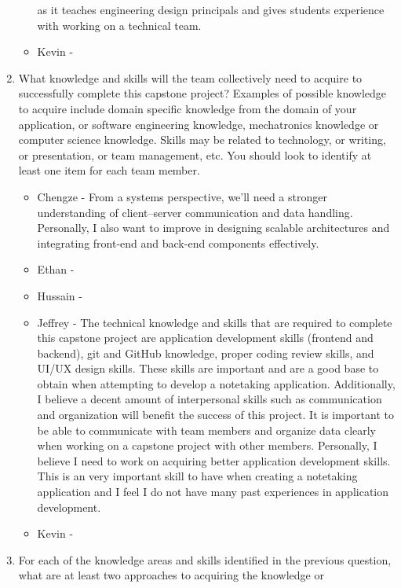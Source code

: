 \begin{enumerate}
\begin{itemize}
        as it teaches engineering design principals and gives students experience 
        with working on a technical team. 
        \item Kevin - 
  \end{itemize} 
  \item What knowledge and skills will the team collectively need to acquire to
  successfully complete this capstone project?  Examples of possible knowledge
  to acquire include domain specific knowledge from the domain of your
  application, or software engineering knowledge, mechatronics knowledge or
  computer science knowledge.  Skills may be related to technology, or writing,
  or presentation, or team management, etc.  You should look to identify at
  least one item for each team member.
  \begin{itemize}
        \item Chengze - From a systems perspective, we’ll need a stronger understanding 
        of client–server communication and data handling. Personally, I also want to 
        improve in designing scalable architectures and integrating front-end and back-end 
        components effectively.
        \item Ethan - 
        \item Hussain - 
        \item Jeffrey - The technical knowledge and skills that are required to
        complete this capstone project are application development skills (frontend and
        backend), git and GitHub knowledge, proper coding review skills, and 
        UI/UX design skills. These skills are important and are a good base
        to obtain when attempting to develop a notetaking application.
        Additionally, I believe a decent amount of 
        interpersonal skills such as communication and organization
        will benefit the success of this project. It is important to 
        be able to communicate with team members and organize data clearly
        when working on a capstone project with other members. 
        Personally, I believe I need to work on acquiring better application
        development skills. This is an very important skill to have when
        creating a notetaking application and I feel I do not have many
        past experiences in application development.
        \item Kevin - 
  \end{itemize} 
  \item For each of the knowledge areas and skills identified in the previous
  question, what are at least two approaches to acquiring the knowledge or

\end{enumerate}
